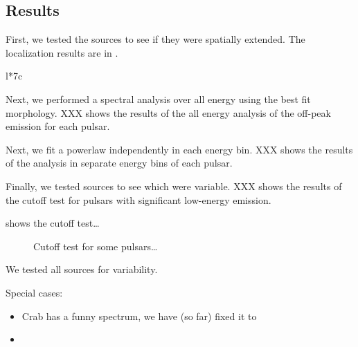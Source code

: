 \subsection{Results}

First, we tested the sources to see if they
were spatially extended. The localization results are in .

\begin{deluxetable}{l*{7}c}
\tabletypesize{\scriptsize}

\end{deluxetable}



Next, we performed a spectral analysis over all energy using the best
fit morphology. XXX shows the results of the all energy
analysis of the off-peak emission for each pulsar.

Next, we fit a powerlaw independently in each energy
bin. XXX shows the results of the analysis in separate
energy bins of each pulsar.

Finally, we tested sources to see which were
variable. XXX shows the results of the cutoff test for
pulsars with significant low-energy emission.





 shows the cutoff test\ldots

\begin{figure}
  \ifdefined\bwfigures
  \else
  \fi
  \caption{Cutoff test for some pulsars\dots}
  \label{fig:cutoff_test}
\end{figure}


We tested all sources for variability.


Special cases:
\begin{itemize}
  \item Crab has a funny spectrum, we have (so far) fixed it to
  \item \velax
\end{itemize}
